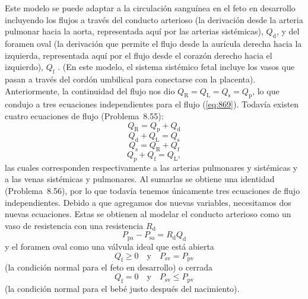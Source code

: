 \documentclass[12pt]{book}
\begin{document}
Este modelo se puede adaptar a la circulación sanguínea en el feto en desarrollo incluyendo los flujos a través del conducto arterioso (la derivación desde la arteria pulmonar hacia la aorta, representada aquí por las arterias sistémicas), $Q_{\text{d}}$, y del foramen oval (la derivación que permite el flujo desde la aurícula derecha hacia la izquierda, representada aquí por el flujo desde el corazón derecho hacia el izquierdo), $Q_{\text{f}}$ \cite{34, 40}. (En este modelo, el sistema sistémico fetal incluye los vasos que pasan a través del cordón umbilical para conectarse con la placenta). Anteriormente, la continuidad del flujo nos dio $Q_{\text{R}} = Q_{\text{L}} = Q_{\text{s}} = Q_{\text{p}}$, lo que condujo a tres ecuaciones independientes para el flujo (\ref{eq:869}). Todavía existen cuatro ecuaciones de flujo (Problema~8.55):
\begin{equation}
Q_{\text{R}} = Q_{\text{p}} + Q_{\text{d}}
\label{eq:883}
\end{equation}
\begin{equation}
Q_{\text{d}} + Q_{\text{L}} = Q_{\text{s}}
\label{eq:884}
\end{equation}
\begin{equation}
Q_{\text{s}} = Q_{\text{R}} + Q_{\text{f}}
\label{eq:885}
\end{equation}
\begin{equation}
Q_{\text{p}} + Q_{\text{f}} = Q_{\text{L}},
\label{eq:886}
\end{equation}
las cuales corresponden respectivamente a las arterias pulmonares y sistémicas y a las venas sistémicas y pulmonares. Al sumarlas se obtiene una identidad (Problema~8.56), por lo que todavía tenemos únicamente tres ecuaciones de flujo independientes. Debido a que agregamos dos nuevas variables, necesitamos dos nuevas ecuaciones. Estas se obtienen al modelar el conducto arterioso como un vaso de resistencia con una resistencia $R_{\text{d}}$
\begin{equation}
P_{\text{pa}} - P_{\text{sa}} = R_{\text{d}} Q_{\text{d}}
\label{eq:887}
\end{equation}
y el foramen oval como una válvula ideal que está abierta
\begin{equation}
Q_{\text{f}} \ge 0 \quad \text{y} \quad P_{\text{sv}} = P_{\text{pv}}
\label{eq:888}
\end{equation}
(la condición normal para el feto en desarrollo) o cerrada
\begin{equation}
Q_{\text{f}} = 0 \quad \text{y} \quad P_{\text{sv}} \le P_{\text{pv}}
\label{eq:889}
\end{equation}
(la condición normal para el bebé justo después del nacimiento).
\end{document}
